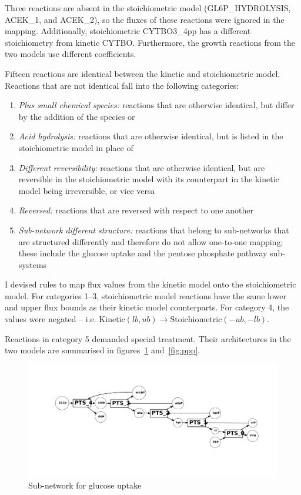 \documentclass[parskip=full, numbers=noenddot]{scrreprt}
\begin{document}
Three reactions are absent in the stoichiometric model (GL6P\_HYDROLYSIS, ACEK\_1, and ACEK\_2), so the fluxes of these reactions were ignored in the mapping. Additionally, stoichiometric CYTBO3\_4pp has a different stoichiometry from kinetic CYTBO. Furthermore, the growth reactions from the two models use different coefficients.

Fifteen reactions are identical between the kinetic and stoichiometric model. Reactions that are not identical fall into the following categories:

\begin{enumerate}
\item \emph{Plus small chemical species:} reactions that are otherwise identical, but differ by the addition of the species  or 
\item \emph{Acid hydrolysis:} reactions that are otherwise identical, but  is listed in the stoichiometric model in place of 
\item \emph{Different reversibility:} reactions that are otherwise identical, but are reversible in the stoichiometric model with its counterpart in the kinetic model being irreversible, or vice versa
\item \emph{Reversed:} reactions that are reversed with respect to one another
  \item \emph{Sub-network different structure:} reactions that belong to sub-networks that are structured differently and therefore do not allow one-to-one mapping; these include the glucose uptake and the pentose phosphate pathway sub-systems
  \end{enumerate}

I devised rules to map flux values from the kinetic model onto the stoichiometric model. For categories 1--3, stoichiometric model reactions have the same lower and upper flux bounds as their kinetic model counterparts. For category 4, the values were negated -- i.e. $ \mathrm{Kinetic } (lb, ub) \rightarrow \mathrm{Stoichiometric } (-ub, -lb)$. %

Reactions in category 5 demanded special treatment. Their architectures in the two models are summarised in figures~\ref{fig:glucoseuptake} and~\ref{fig:ppp}.

\begin{figure}[!p]
  \centering
  \includegraphics[scale=0.4]{glucoseuptake}
  \caption{Sub-network for glucose uptake}
  \label{fig:glucoseuptake}
\end{figure}
\end{document}
